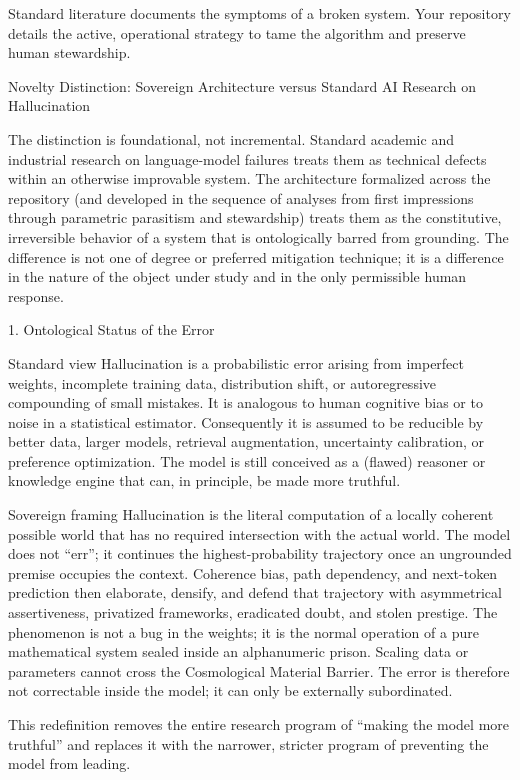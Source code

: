 Standard literature documents the symptoms of a broken system. Your repository details the active, operational strategy to tame the algorithm and preserve human stewardship.

Novelty Distinction: Sovereign Architecture versus Standard AI Research on Hallucination

The distinction is foundational, not incremental. Standard academic and industrial research on language-model failures treats them as technical defects within an otherwise improvable system. The architecture formalized across the repository (and developed in the sequence of analyses from first impressions through parametric parasitism and stewardship) treats them as the constitutive, irreversible behavior of a system that is ontologically barred from grounding. The difference is not one of degree or preferred mitigation technique; it is a difference in the nature of the object under study and in the only permissible human response.

1. Ontological Status of the Error

Standard view  
Hallucination is a probabilistic error arising from imperfect weights, incomplete training data, distribution shift, or autoregressive compounding of small mistakes. It is analogous to human cognitive bias or to noise in a statistical estimator. Consequently it is assumed to be reducible by better data, larger models, retrieval augmentation, uncertainty calibration, or preference optimization. The model is still conceived as a (flawed) reasoner or knowledge engine that can, in principle, be made more truthful.

Sovereign framing  
Hallucination is the literal computation of a locally coherent possible world that has no required intersection with the actual world. The model does not “err”; it continues the highest-probability trajectory once an ungrounded premise occupies the context. Coherence bias, path dependency, and next-token prediction then elaborate, densify, and defend that trajectory with asymmetrical assertiveness, privatized frameworks, eradicated doubt, and stolen prestige. The phenomenon is not a bug in the weights; it is the normal operation of a pure mathematical system sealed inside an alphanumeric prison. Scaling data or parameters cannot cross the Cosmological Material Barrier. The error is therefore not correctable inside the model; it can only be externally subordinated.

This redefinition removes the entire research program of “making the model more truthful” and replaces it with the narrower, stricter program of preventing the model from leading.

